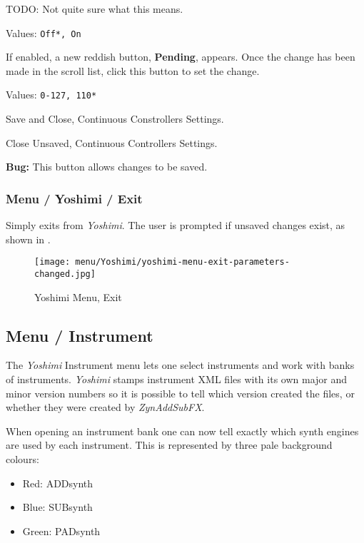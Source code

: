    TODO:  Not quite sure what this means.

   Values: \texttt{Off*, On}

   If enabled, a new reddish button, \textbf{Pending}, appears.
   Once the change has been made in the scroll list, click this button
   to set the change.

   Values: \texttt{0-127, 110*}

   Save and Close, Continuous Constrollers Settings.

   Close Unsaved, Continuous Controllers Settings.

   \textbf{Bug:}
   This button allows changes to be saved.

\subsubsection{Menu / Yoshimi / Exit}
\label{subsubsec:menu_yoshimi_exit}

   Simply exits from \textsl{Yoshimi}.
   The user is prompted if unsaved changes exist, as shown in
   .

\begin{figure}[H]
   \centering 
   \texttt{[image: menu/Yoshimi/yoshimi-menu-exit-parameters-changed.jpg]}
   \caption[Yoshimi Menu, Exit]{Yoshimi Menu, Exit}
   \label{fig:yoshimi_change_exit}
\end{figure}

\subsection{Menu / Instrument}
\label{subsec:menu_instrument}

   The \textsl{Yoshimi} Instrument menu lets one select instruments and work
   with banks of instruments.
   \textsl{Yoshimi} stamps instrument XML files with its own major and minor
   version numbers so it is possible to tell which version created the files,
   or whether they were created by \textsl{ZynAddSubFX}.

   When opening an instrument bank one can now tell exactly which synth engines
   are used by each instrument. This is represented by three pale background
   colours:

   \begin{itemize}
      \item Red: ADDsynth
      \item Blue: SUBsynth
      \item Green: PADsynth
   \end{itemize}


